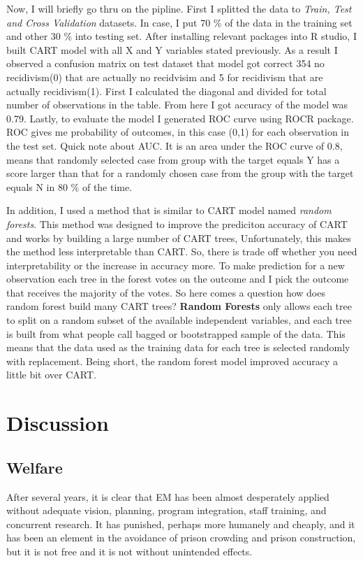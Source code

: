 \documentclass[a4paper,12pt]{article}
\begin{document}
Now, I will briefly go thru on the pipline. First I splitted the data to \textit{Train, Test and Cross Validation} datasets. In case, I put 70 \% of the data in the training set and other 30 \% into testing set. After installing relevant packages into R studio, I built CART model with all X and Y variables stated previously. As a result I observed a confusion matrix on test dataset that model got correct 354 no recidivism(0) that are actually no recidvisim and 5 for recidivism that are actually recidivism(1). First I calculated the diagonal and divided for total number of observations in the table. From here I got accuracy of the model was 0.79. Lastly, to evaluate the model I generated ROC curve using ROCR package. ROC gives me probability of outcomes, in this case (0,1) for each observation in the test set. Quick note about AUC. It is an area under the ROC curve of 0.8, means that randomly selected case from group with the target equals Y has a score larger than that for a randomly chosen case from the group with the target equals N in 80 \% of the time. 

In addition, I used a method that is similar to CART model named \textit{random forests}. This method was designed to improve the prediciton accuracy of CART and works by building a large number of CART trees, Unfortunately, this makes the method less interpretable than CART. So, there is trade off whether you need interpretability or the increase in accuracy more. To make prediction for a new observation each tree in the forest votes on the outcome and I pick the outcome that  receives the majority of the votes. So here comes a question how does random forest build many CART trees? \textbf{Random Forests} only allows each tree to split on a random subset of the available independent variables, and each tree is built from what people call bagged or bootstrapped sample of the data. This means that the data used as the training data for each tree is selected randomly with replacement. Being short, the random forest model improved accuracy a little bit over CART. 



\section{Discussion}
\subsection{Welfare}
After several years, it is clear that EM has been almost desperately applied without adequate vision, planning, program integration, staff training, and concurrent research. It has punished, perhaps more humanely and cheaply, and it has been an element in the avoidance of prison crowding and prison construction, but it is not free and it is not without unintended effects. 
\end{document}
